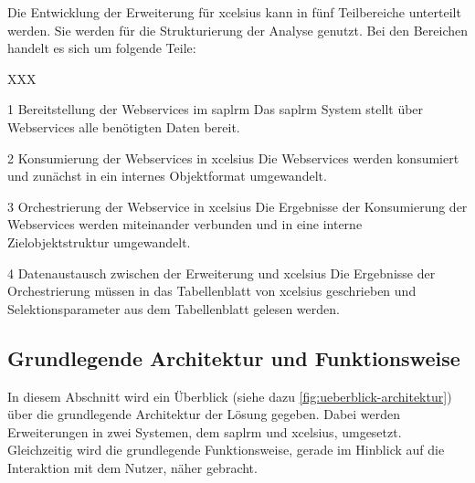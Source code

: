 \begin{onehalfspacing}
Die Entwicklung der Erweiterung für \gls{xcelsius} kann in fünf Teilbereiche unterteilt werden. Sie werden für die Strukturierung der Analyse genutzt. Bei den Bereichen handelt es sich um folgende Teile:


\begin{seToplist} { XXX }
\item[ 1] Bereitstellung der Webservices im \gls{saplrm} \newline
Das \gls{saplrm} System stellt über Webservices alle benötigten Daten bereit.

\item[ 2] Konsumierung der Webservices in \gls{xcelsius} \newline
Die Webservices werden konsumiert und zunächst in ein internes Objektformat umgewandelt.

\item[ 3] Orchestrierung der Webservice in \gls{xcelsius} \newline
Die Ergebnisse der Konsumierung der Webservices werden miteinander verbunden und in eine interne Zielobjektstruktur umgewandelt.

\item[ 4] Datenaustausch zwischen der Erweiterung und \gls{xcelsius} \newline
Die Ergebnisse der Orchestrierung müssen in das Tabellenblatt von \gls{xcelsius} geschrieben und Selektionsparameter aus dem Tabellenblatt gelesen werden.

\end{seToplist}

\subsection{Grundlegende Architektur und Funktionsweise}
In diesem Abschnitt wird ein Überblick (siehe dazu \vref{fig:ueberblick-architektur}) über die grundlegende Architektur der Lösung gegeben. Dabei werden Erweiterungen in zwei Systemen, dem \gls{saplrm} und \gls{xcelsius}, umgesetzt. Gleichzeitig wird die grundlegende Funktionsweise, gerade im Hinblick auf die Interaktion mit dem Nutzer, näher gebracht.


\end{onehalfspacing}
